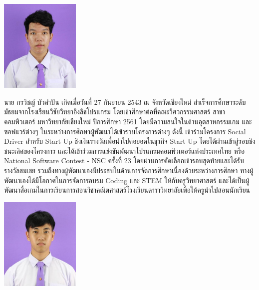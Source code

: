 \documentclass[semifinal]{cpecmu}
\author{กรวิชญ์ บัวคำปัน}{Goravit Buakampun}{610610567}
\author{กิตติพงษ์ ไมล์หรือ}{Kittipong Milerue}{610610570}
\begin{document}


\pagestyle{empty}\cleardoublepage
\normalspacing \setcounter{page}{1}  \pagestyle{cpecmu}





\ifproject

\fi



\ifproject
\appendix


\ifglossary\glossarypage\fi

\ifindex\indexpage\fi

\begin{biosketch}
\begin{center}
  \includegraphics[width=1.5in]{pic-toro/me.jpg}
\end{center}
นาย กรวิชญ์ บัวคำปัน เกิดเมื่อวันที่ 27 กันยายน 2543 ณ จังหวัดเชียงใหม่ สำเร็จการศึกษาระดับมัธยมจากโรงเรียนวิชัยวิทยาอิงลิชโปรแกรม โดยเข้าศึกษาต่อที่คณะวิศวกรรมศาสตร์ สาขาคอมพิวเตอร์ มหาวิทยาลัยเชียงใหม่ ปีการศึกษา 2561
โดยมีความสนใจในด้านอุตสาหกรรมเกม และซอฟแวร์ต่างๆ ในระหว่างการศึกษาผู้พัฒนาได้เข้าร่วมโครงการต่างๆ ดังนี้ เข้าร่วมโครงการ Social Driver สำหรับ Start-Up ชิงเงินรางวัลเพื่อนำไปต่อยอดในธุรกิจ Start-Up โดยได้ผ่านเข้าสู่รอบชิงชนะเลิศของโครงการ
และได้เข้าร่วมการแข่งขันพัฒนาโปรแกรมคอมพิวเตอร์แห่งประเทศไทย หรือ National Software Contest - NSC ครั้งที่ 23 โดยผ่านการคัดเลือกเข้ารอบสุดท้ายและได้รับรางวัลชมเชย รวมถึงทางผู้พัฒนาเองมีประสบในด้านการจัดการศึกษาเนื่องด้วยระหว่างการศึกษา
ทางผู้พัฒนาเองได้มีโอกาศในการจัดการอบรม Coding และ STEM ให้กับครูวิทยาศาสตร์ และได้เป็นผู้พัฒนาสื่อเกมในการเรียนการสอนวิชาคณิตศาสตร์โรงเรียนดาราวิทยาลัยเพื่อให้ครูนำไปสอนนักเรียน
\newline
\begin{center}
  \includegraphics[width=1.5in]{pic/ToonImg.jpg}  

\end{center}
\end{biosketch}
\end{document}
